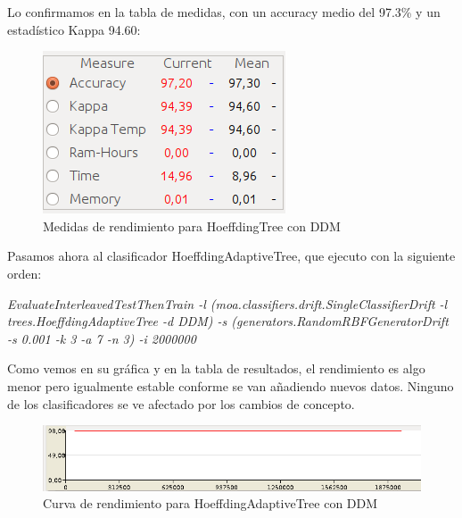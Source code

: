 Lo confirmamos en la tabla de medidas, con un accuracy medio del 97.3\% y un estadístico Kappa 94.60:

\begin{figure}[H] %
	\centering
	\includegraphics[scale=0.5]{measures51.png}  %
	\caption{Medidas de rendimiento para HoeffdingTree con DDM} 
	\label{fig:measure51}
\end{figure}


Pasamos ahora al clasificador HoeffdingAdaptiveTree, que ejecuto con la siguiente orden:

\textit{EvaluateInterleavedTestThenTrain -l (moa.classifiers.drift.SingleClassifierDrift -l \\ trees.HoeffdingAdaptiveTree -d DDM) -s (generators.RandomRBFGeneratorDrift -s 0.001 -k 3 -a 7 -n 3) -i 2000000}

Como vemos en su gráfica y en la tabla de resultados, el rendimiento es algo menor pero igualmente estable conforme se van  añadiendo nuevos datos. Ninguno de los clasificadores se ve afectado por los cambios de concepto.

\begin{figure}[H] %
	\centering
	\includegraphics[scale=0.5]{graph52.png}  %
	\caption{Curva de rendimiento para HoeffdingAdaptiveTree con DDM} 
	\label{fig:graph52}
\end{figure}

